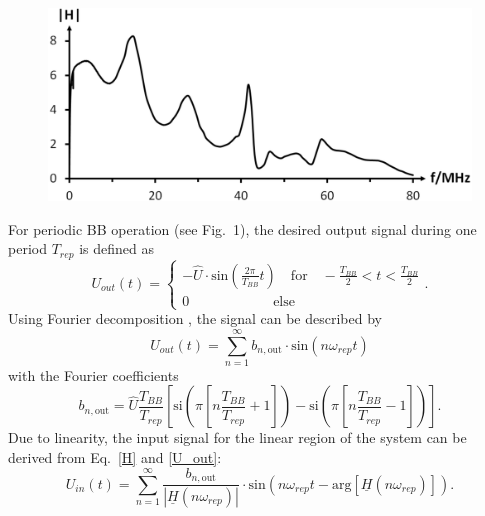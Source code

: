\documentclass[a4paper,
              ]{jacow}
\begin{document}
	\begin{figure}[b]
	 \begin{center}
	  \includegraphics[scale=0.27]{WEPVA047f3.eps}
	  \label{H_ESR}
	  \vspace*{-\baselineskip}
	 \end{center}
	\end{figure}	

	
	For periodic BB operation (see Fig.~1), the desired output signal during one period $T_{rep}$ is defined as
	\begin{equation}
	 U_{out}(t)=\begin{cases}
	             -\hat{U}\cdot \text{sin}\left(\frac{2\pi}{T_{BB}}t\right) \quad \text{for} \quad -\frac{T_{BB}}{2}<t<\frac{T_{BB}}{2} \\
	             0 \qquad \qquad \qquad \text{else}
	            \end{cases}.
	\end{equation}
	Using Fourier decomposition \cite{gross}, the signal can be described by 
	\begin{equation}
	  U_{out}(t)=\sum \limits_{n=1}^\infty b_{n,\text{out}}\cdot \text{sin}(n\omega_{rep}t)
	  \label{U_out}
	\end{equation}
	with the Fourier coefficients
	\begin{equation}
	  b_{n, \text{out}}=\hat{U}\frac{T_{BB}}{T_{rep}}\left[\text{si}\left(\pi\left[n\frac{T_{BB}}{T_{rep}}+1\right]\right)-\text{si}\left(\pi\left[n\frac{T_{BB}}{T_{rep}}-1\right]\right)\right].
	\end{equation}	
	Due to linearity, the input signal for the linear region of the system can be derived from Eq.~\eqref{H} and \eqref{U_out}:
	\begin{equation}
	  U_{in}(t)=\sum \limits_{n=1}^\infty \frac{b_{n,\text{out}}}{|\underline{H}(n\omega_{rep})|}\cdot \text{sin}\left(n\omega_{rep}t-\text{arg}[\underline{H}(n\omega_{rep})]\right).
	  \label{VV_lin}
	\end{equation}
\end{document}
